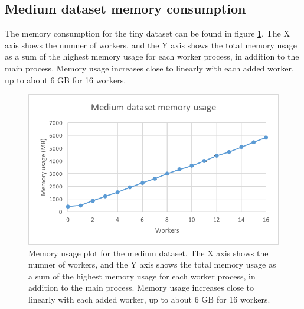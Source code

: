 \subsection{Medium dataset memory consumption}
The memory consumption for the tiny dataset can be found in figure \ref{fig:dataset_3_memory}.
The X axis shows the numner of workers, and the Y axis shows the total memory usage as
a sum of the highest memory usage for each worker process, in addition to the main process. Memory usage increases close to linearly with each added worker,
up to about 6 GB for 16 workers.
\begin{figure}[ht]
  \centering
  \includegraphics[width=120mm]{figures/dataset_3/dataset_3_memory.png}
  \caption[Memory usage plot for the medium dataset.]{Memory usage plot for the medium dataset. The X axis shows the numner of workers, and the Y axis shows the total memory usage as
  a sum of the highest memory usage for each worker process, in addition to the main process. Memory usage increases close to linearly with each added worker,
  up to about 6 GB for 16 workers.}
  \label{fig:dataset_3_memory}
\end{figure}



